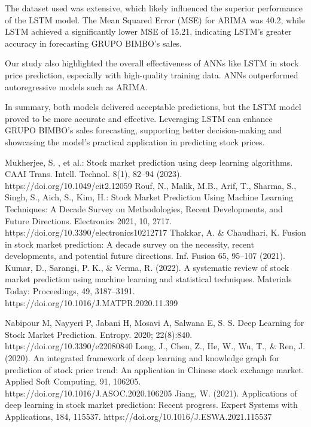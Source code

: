 \documentclass[conference]{IEEEtran}
\begin{document}
The dataset used was extensive, which likely influenced the superior performance of the LSTM model. The Mean Squared Error (MSE) for ARIMA was 40.2, while LSTM achieved a significantly lower MSE of 15.21, indicating LSTM's greater accuracy in forecasting GRUPO BIMBO's sales.

Our study also highlighted the overall effectiveness of ANNs like LSTM in stock price prediction, especially with high-quality training data. ANNs outperformed autoregressive models such as ARIMA.

In summary, both models delivered acceptable predictions, but the LSTM model proved to be more accurate and effective. Leveraging LSTM can enhance GRUPO BIMBO's sales forecasting, supporting better decision-making and showcasing the model's practical application in predicting stock prices.

\begin{thebibliography}{00}

Mukherjee, S. , et al.: Stock market prediction using deep learning algorithms. CAAI Trans. Intell. Technol. 8(1), 82–94 (2023). https://doi.org/10.1049/cit2.12059
Rouf, N., Malik, M.B., Arif, T., Sharma, S., Singh, S., Aich, S., Kim, H.: Stock Market Prediction Using Machine Learning Techniques: A Decade Survey on Methodologies, Recent Developments, and Future Directions. Electronics 2021, 10, 2717. https://doi.org/10.3390/electronics10212717
Thakkar, A. \& Chaudhari, K. Fusion in stock market prediction: A decade survey on the necessity, recent developments, and potential future directions. Inf. Fusion 65, 95–107 (2021).
 Kumar, D., Sarangi, P. K., \& Verma, R. (2022). A systematic review of stock market prediction using machine learning and statistical techniques. Materials Today: Proceedings, 49, 3187–3191. https://doi.org/10.1016/J.MATPR.2020.11.399

Nabipour M, Nayyeri P, Jabani H, Mosavi A, Salwana E, S. S. Deep Learning for Stock Market Prediction. Entropy. 2020; 22(8):840. https://doi.org/10.3390/e22080840
Long, J., Chen, Z., He, W., Wu, T., \& Ren, J. (2020). An integrated framework of deep learning and knowledge graph for prediction of stock price trend: An application in Chinese stock exchange market. Applied Soft Computing, 91, 106205. https://doi.org/10.1016/J.ASOC.2020.106205
Jiang, W. (2021). Applications of deep learning in stock market prediction: Recent progress. Expert Systems with Applications, 184, 115537. https://doi.org/10.1016/J.ESWA.2021.115537
\end{thebibliography}
\end{document}
